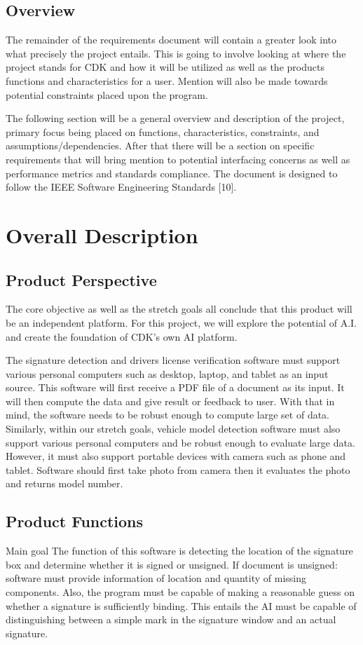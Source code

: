 \documentclass[onecolumn, draftclsnofoot,10pt, compsoc]{IEEEtran}
\begin{document}
\subsection{Overview}
The remainder of the requirements document will contain a greater look into what precisely the project entails. This is going to involve looking at where the project stands for CDK and how it will be utilized as well as the products functions and characteristics for a user. Mention will also be made towards potential constraints placed upon the program.

The following section will be a general overview and description of the project, primary focus being placed on functions, characteristics, constraints, and assumptions/dependencies. After that there will be a section on specific requirements that will bring mention to potential interfacing concerns as well as performance metrics and standards compliance. The document is designed to follow the IEEE Software Engineering Standards [10].


\section{Overall Description}
\subsection{Product Perspective}
The core objective as well as the stretch goals all conclude that this product will be an independent platform. For this project, we will explore the potential of A.I. and create the foundation of CDK’s own AI platform.

The signature detection and drivers license verification software must support various personal computers such as desktop, laptop, and tablet as an input source. This software will first receive a PDF file of a document as its input. It will then compute the data and give result or feedback to user. With that in mind, the software needs to be robust enough to compute large set of data. Similarly, within our stretch goals, vehicle model detection software must also support various personal computers and be robust enough to evaluate large data. However, it must also support portable devices with camera such as phone and tablet. Software should first take photo from camera then it evaluates the photo and returns model number.

\subsection{Product Functions}
Main goal
The function of this software is detecting the location of the signature box and determine whether it is signed or unsigned. If document is unsigned: software must provide information of location and quantity of missing components. Also, the program must be capable of making a reasonable guess on whether a signature is sufficiently binding. This entails the AI must be capable of distinguishing between a simple mark in the signature window and an actual signature.
\end{document}
